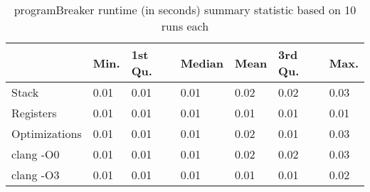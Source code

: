 \begin{table}[h!]
\centering
\begin{tabular}{p{}p{}p{}p{}p{}p{}p{}}
  \hline
 & Min. & 1st Qu. & Median & Mean & 3rd Qu. & Max. \\ 
  \hline
Stack & 0.01 & 0.01 & 0.01 & 0.02 & 0.02 & 0.03 \\ 
  Registers & 0.01 & 0.01 & 0.01 & 0.01 & 0.01 & 0.01 \\ 
  Optimizations & 0.01 & 0.01 & 0.01 & 0.02 & 0.01 & 0.03 \\ 
  clang -O0 & 0.01 & 0.01 & 0.01 & 0.02 & 0.02 & 0.03 \\ 
  clang -O3 & 0.01 & 0.01 & 0.01 & 0.01 & 0.01 & 0.02 \\ 
   \hline
\end{tabular}
\caption{programBreaker runtime (in seconds) summary statistic based on 10 runs each}
\end{table}
